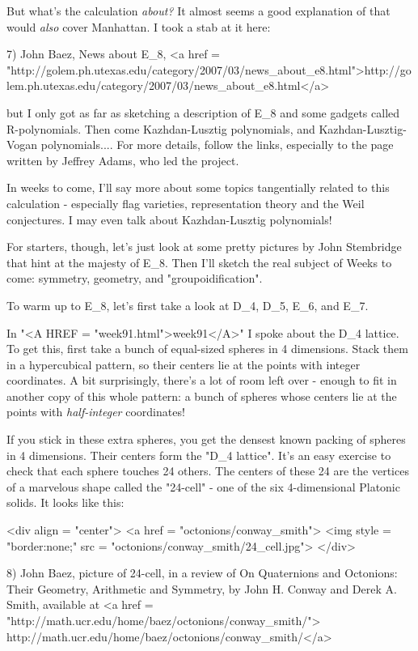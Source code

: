 But what's the calculation \emph{about?} It almost seems a good
explanation of that would \emph{also} cover Manhattan.  I took a
stab at it here:

7) John Baez, News about E_{8}, 
<a href = "http://golem.ph.utexas.edu/category/2007/03/news_about_e8.html">http://golem.ph.utexas.edu/category/2007/03/news_about_e8.html</a>

but I only got as far as sketching a description of E_{8} and some gadgets
called R-polynomials.  Then come Kazhdan-Lusztig polynomials, and 
Kazhdan-Lusztig-Vogan polynomials....  For more details, follow
the links, especially to the page written by Jeffrey Adams, who led
the project.

In weeks to come, I'll say more about some topics tangentially related
to this calculation - especially flag varieties, representation theory
and the Weil conjectures.  I may even talk about Kazhdan-Lusztig polynomials!

For starters, though, let's just look at some pretty pictures by John Stembridge
that hint at the majesty of E_{8}.  Then I'll sketch the real subject 
of Weeks to come: symmetry, geometry, and "groupoidification".

To warm up to E_{8}, let's first take a look at D_{4}, D_{5}, E_{6}, and E_{7}.  

In "<A HREF = "week91.html">week91</A>" I spoke about the D_{4}
lattice.  To get this, first take a bunch of equal-sized spheres in 4
dimensions.  Stack them in a hypercubical pattern, so their centers
lie at the points with integer coordinates.  A bit surprisingly,
there's a lot of room left over - enough to fit in another copy of
this whole pattern: a bunch of spheres whose centers lie at the points
with \emph{half-integer} coordinates!

If you stick in these extra spheres, you get the densest known packing
of spheres in 4 dimensions.  Their centers form the "D_{4}
lattice".  It's an easy exercise to check that each sphere
touches 24 others.  The centers of these 24 are the vertices of a
marvelous shape called the "24-cell" - one of the six
4-dimensional Platonic solids.  It looks like this:

<div align = "center">
<a href = "octonions/conway_smith">
<img style = "border:none;" src = "octonions/conway_smith/24_cell.jpg">
</div>

8) John Baez, picture of 24-cell, in a review of On Quaternions
and Octonions: Their Geometry, Arithmetic and Symmetry, by John H.
Conway and Derek A. Smith, available at 
<a href = "http://math.ucr.edu/home/baez/octonions/conway_smith/">
http://math.ucr.edu/home/baez/octonions/conway_smith/</a>

